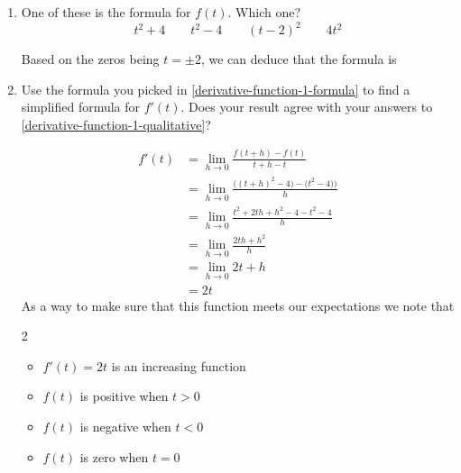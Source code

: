 \documentclass{article}
\begin{document}
\begin{enumerate}
\begin{enumerate}
  \item \label{derivative-function-1-formula}

    \begin{problem}[0.25in]
      One of these is the formula for $f(t)$. Which one?
      \[ t^2 + 4 \qquad t^2 - 4 \qquad (t - 2)^2 \qquad 4t^2 \]
    \end{problem}

    \begin{solution}
      Based on the zeros being $t=\pm 2$, we can deduce that the formula is 
    \end{solution}

  \item
    \begin{problem}[\stretch{1.5}]
      Use the formula you picked in \ref{derivative-function-1-formula} to find a simplified formula for $f'(t)$. Does your result agree with your answers to \ref{derivative-function-1-qualitative}?
    \end{problem}

    \begin{solution} 

      \begin{align*} 
        f'(t) &= \lim_{h \to 0} \frac{ f(t+h) -f(t) }{t+h-t} \\
        &= \lim_{h \to 0} \frac{ \bigl((t+h)^2-4\bigr) - \bigl(t^2-4)\bigr)}{h} \\
        &= \lim_{h \to 0} \frac{ t^2 +2th+h^2 - 4 - t^2 - 4}{h} \\
        &= \lim_{h \to 0} \frac{ 2th +h^2}{h} \\
        &= \lim_{h \to 0} 2t +h \\
        &= \boxed{2t}
      \end{align*} 
      As a way to make sure that this function meets our expectations we note that
      \begin{multicols}{2} \begin{itemize} 
        \item $f'(t) = 2t$ is an increasing function
        \item $f(t)$ is positive when $t>0$ 
        \item $f(t)$ is negative when $t<0$ 
        \item $f(t)$ is zero when $t=0$
        \end{itemize} 
      \end{multicols}

    \end{solution}


\end{enumerate}
\end{enumerate}
\end{document}
